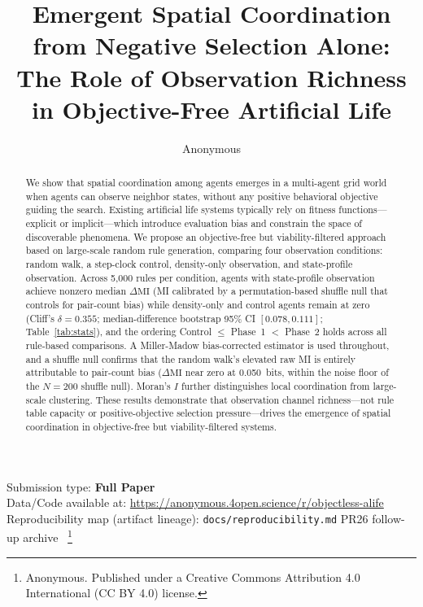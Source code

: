 \documentclass[letterpaper]{article}
\title{Emergent Spatial Coordination from Negative Selection Alone:\\
The Role of Observation Richness in Objective-Free Artificial Life}
\author{Anonymous}
\newcommand\blfootnote[1]{%
  \begingroup
  \renewcommand\thefootnote{}\footnote{#1}%
  \addtocounter{footnote}{-1}%
  \endgroup
}
\begin{document}
\maketitle

\begin{abstract}
We show that spatial coordination among agents emerges in a multi-agent grid world
when agents can observe neighbor states, without any positive behavioral
objective guiding the search.
Existing artificial life systems typically rely on fitness functions---explicit
or implicit---which introduce evaluation bias and constrain the space of
discoverable phenomena.
We propose an objective-free but viability-filtered approach based on
large-scale random rule generation, comparing four observation conditions:
random walk, a step-clock control, density-only observation, and state-profile observation.
Across 5{,}000 rules per condition, agents with state-profile observation
achieve nonzero median $\Delta\mathrm{MI}$ (MI calibrated by a permutation-based shuffle
null that controls for pair-count bias) while
density-only and control agents remain at zero
(Cliff's $\delta = 0.355$; median-difference bootstrap 95\% CI $[0.078, 0.111]$; Table~\ref{tab:stats}),
and the ordering Control $\leq$ Phase~1 $<$ Phase~2 holds across all
rule-based comparisons.
A Miller-Madow bias-corrected estimator is used throughout, and a shuffle null
confirms that the random walk's elevated raw MI is entirely attributable to
pair-count bias ($\Delta\mathrm{MI}$ near zero at 0.050~bits, within the noise
floor of the $N\!=\!200$ shuffle null).
Moran's $I$ further distinguishes local coordination from large-scale clustering.
These results demonstrate that observation channel richness---not rule table
capacity or positive-objective selection pressure---drives the emergence of
spatial coordination in objective-free but viability-filtered systems.
\end{abstract}

Submission type: \textbf{Full Paper}\\

Data/Code available at: \url{https://anonymous.4open.science/r/objectless-alife}
\newline Reproducibility map (artifact lineage): \texttt{docs/reproducibility.md}
\newline PR26 follow-up archive~\citep{pr26archive2026}
\blfootnote{ Anonymous.
  Published under a Creative Commons Attribution 4.0
  International (CC BY 4.0) license.}
\end{document}

